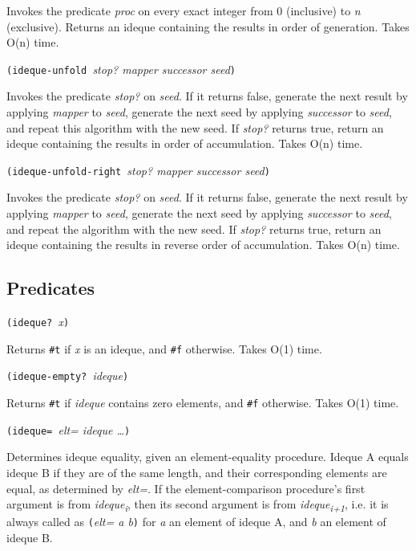 Invokes the predicate \emph{proc} on every exact integer from 0
(inclusive) to \emph{n} (exclusive). Returns an ideque containing the
results in order of generation. Takes O(n) time.

\texttt{(ideque-unfold\ }\emph{stop? mapper successor seed}\texttt{)}

Invokes the predicate \emph{stop?} on \emph{seed}. If it returns false,
generate the next result by applying \emph{mapper} to \emph{seed},
generate the next seed by applying \emph{successor} to \emph{seed}, and
repeat this algorithm with the new seed. If \emph{stop?} returns true,
return an ideque containing the results in order of accumulation. Takes
O(n) time.

\texttt{(ideque-unfold-right\ }\emph{stop? mapper successor
seed}\texttt{)}

Invokes the predicate \emph{stop?} on \emph{seed}. If it returns false,
generate the next result by applying \emph{mapper} to \emph{seed},
generate the next seed by applying \emph{successor} to \emph{seed}, and
repeat the algorithm with the new seed. If \emph{stop?} returns true,
return an ideque containing the results in reverse order of
accumulation. Takes O(n) time.

\hypertarget{Predicates}{\subsection{Predicates}\label{Predicates}}

\texttt{(ideque?\ }\emph{x}\texttt{)}

Returns \texttt{\#t} if \emph{x} is an ideque, and \texttt{\#f}
otherwise. Takes O(1) time.

\texttt{(ideque-empty?\ }\emph{ideque}\texttt{)}

Returns \texttt{\#t} if \emph{ideque} contains zero elements, and
\texttt{\#f} otherwise. Takes O(1) time.

\texttt{(ideque=\ }\emph{elt= ideque \ldots{}}\texttt{)}

Determines ideque equality, given an element-equality procedure. Ideque
A equals ideque B if they are of the same length, and their
corresponding elements are equal, as determined by \emph{elt=}. If the
element-comparison procedure's first argument is from
\emph{ideque\textsubscript{i}}, then its second argument is from
\emph{ideque\textsubscript{i+1}}, i.e. it is always called as
\texttt{(}\emph{elt= a b}\texttt{)} for \emph{a} an element of ideque A,
and \emph{b} an element of ideque B.

